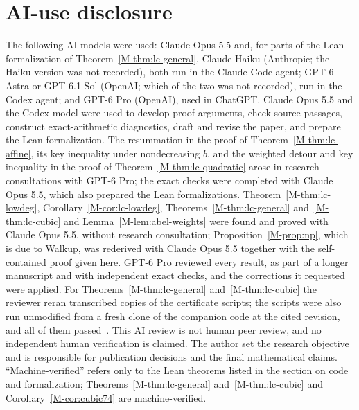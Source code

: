 \section*{AI-use disclosure}
The following AI models were used: Claude Opus 5.5 and, for parts of the Lean formalization of Theorem~\ref{M-thm:lc-general}, Claude Haiku (Anthropic; the Haiku version was not recorded), both run in the Claude Code agent; GPT-6 Astra or GPT-6.1 Sol (OpenAI; which of the two was not recorded), run in the Codex agent; and GPT-6 Pro (OpenAI), used in ChatGPT. Claude Opus 5.5 and the Codex model were used to develop proof arguments, check source passages, construct exact-arithmetic diagnostics, draft and revise the paper, and prepare the Lean formalization. The resummation in the proof of Theorem~\ref{M-thm:lc-affine}, its key inequality under nondecreasing $b$, and the weighted detour and key inequality in the proof of Theorem~\ref{M-thm:lc-quadratic} arose in research consultations with GPT-6 Pro; the exact checks were completed with Claude Opus 5.5, which also prepared the Lean formalizations. Theorem~\ref{M-thm:lc-lowdeg}, Corollary~\ref{M-cor:lc-lowdeg}, Theorems~\ref{M-thm:lc-general} and~\ref{M-thm:lc-cubic} and Lemma~\ref{M-lem:abel-weights} were found and proved with Claude Opus 5.5, without research consultation; Proposition~\ref{M-prop:np}, which is due to Walkup, was rederived with Claude Opus 5.5 together with the self-contained proof given here. GPT-6 Pro reviewed every result, as part of a longer manuscript and with independent exact checks, and the corrections it requested were applied. For Theorems~\ref{M-thm:lc-general} and~\ref{M-thm:lc-cubic} the reviewer reran transcribed copies of the certificate scripts; the scripts were also run unmodified from a fresh clone of the companion code at the cited revision, and all of them passed~\cite{docs}. This AI review is not human peer review, and no independent human verification is claimed. The author set the research objective and is responsible for publication decisions and the final mathematical claims. ``Machine-verified'' refers only to the Lean theorems listed in the section on code and formalization; Theorems~\ref{M-thm:lc-general} and~\ref{M-thm:lc-cubic} and Corollary~\ref{M-cor:cubic74} are machine-verified.


